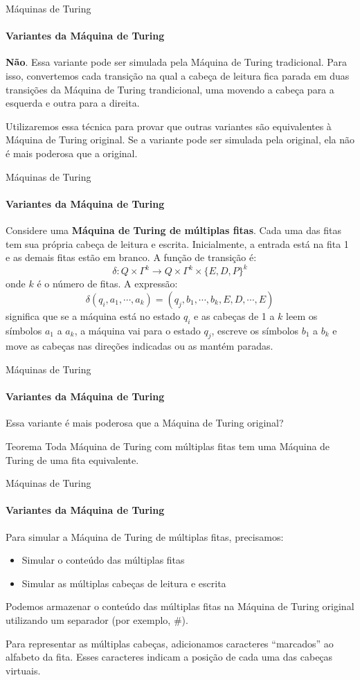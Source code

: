 \documentclass{beamer}
\begin{document}
\begin{frame}{Máquinas de Turing}
	\framesubtitle{Variantes da Máquina de Turing}
	\textbf{Não}. Essa variante pode ser \alert{simulada} pela Máquina de Turing tradicional. Para isso, convertemos cada transição na qual a cabeça de leitura fica parada em duas transições da Máquina de Turing trandicional, uma movendo a cabeça para a esquerda e outra para a direita.
	
	Utilizaremos essa técnica para provar que outras variantes são equivalentes à Máquina de Turing original. Se a variante pode ser simulada pela original, ela não é mais poderosa que a original.
\end{frame}
\begin{frame}{Máquinas de Turing}
	\framesubtitle{Variantes da Máquina de Turing}
	Considere uma \textbf{Máquina de Turing de múltiplas fitas}. Cada uma das fitas tem sua própria cabeça de leitura e escrita. Inicialmente, a entrada está na fita 1 e as demais fitas estão em branco. A função de transição é:
	\begin{equation*}
		\delta: Q \times \Gamma^{k} \rightarrow Q \times \Gamma^{k} \times \{E,D,P\}^{k}
	\end{equation*}
	onde $k$ é o número de fitas. A expressão:
	\begin{equation*}
		\delta(q_{i}, a_{1}, \cdots, a_{k}) = (q_{j}, b_{1}, \cdots, b_{k}, E, D, \cdots, E)
	\end{equation*}
	significa que se a máquina está no estado $q_{i}$ e as cabeças de 1 a $k$ leem os símbolos $a_{1}$ a $a_{k}$, a máquina vai para o estado $q_{j}$, escreve os símbolos $b_{1}$ a $b_{k}$ e move as cabeças nas direções indicadas ou as mantém paradas.
\end{frame}
\begin{frame}{Máquinas de Turing}
	\framesubtitle{Variantes da Máquina de Turing}
	Essa variante é mais poderosa que a Máquina de Turing original? \pause
	\begin{block}{Teorema}
		Toda Máquina de Turing com múltiplas fitas tem uma Máquina de Turing de uma fita equivalente.
	\end{block}
\end{frame}
\begin{frame}{Máquinas de Turing}
	\framesubtitle{Variantes da Máquina de Turing}
	Para simular a Máquina de Turing de múltiplas fitas, precisamos:
	\begin{itemize}
		\item Simular o conteúdo das múltiplas fitas
		\item Simular as múltiplas cabeças de leitura e escrita
	\end{itemize}
	Podemos armazenar o conteúdo das múltiplas fitas na Máquina de Turing original utilizando um separador (por exemplo, \#).
	
	Para representar as múltiplas cabeças, adicionamos caracteres ``marcados'' ao alfabeto da fita. Esses caracteres indicam a posição de cada uma das cabeças virtuais.
\end{frame}
\end{document}
